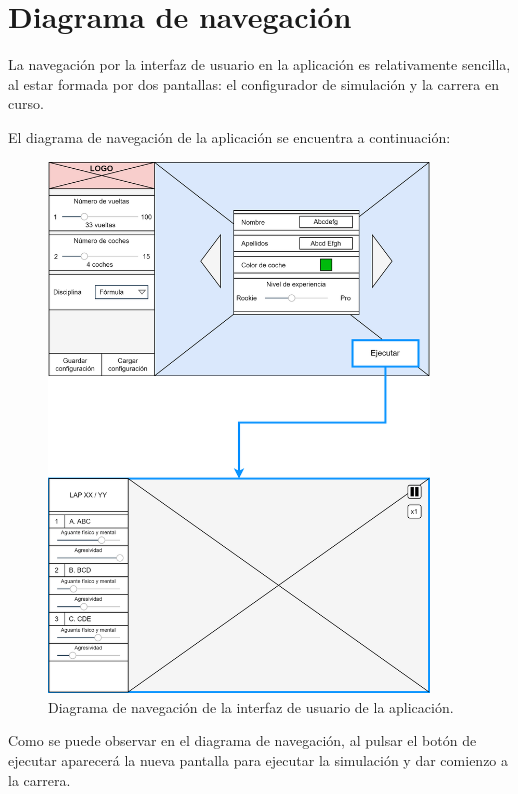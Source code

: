 \section{Diagrama de navegación}

La navegación por la interfaz de usuario en la aplicación es relativamente sencilla, al estar formada por dos pantallas: el configurador de simulación y la carrera en curso.

\bigskip
\newpage
El diagrama de navegación de la aplicación se encuentra a continuación:

\begin{figure}[H]
    \centering
    \includegraphics[width=0.9\textwidth]{imagenes/nav.png}
    \caption{Diagrama de navegación de la interfaz de usuario de la aplicación.}
\end{figure}

Como se puede observar en el diagrama de navegación, al pulsar el botón de ejecutar aparecerá la nueva pantalla para ejecutar la simulación y dar comienzo a la carrera.

